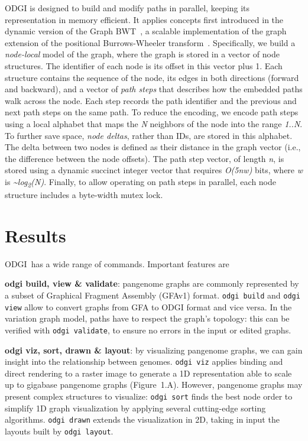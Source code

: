 \documentclass{bioinfo}
\newcommand{\odgi}{ODGI}
\newcommand{\cmd}[1]{{\texttt{#1}}}
\newcommand{\cmdbf}[1]{{\textbf{#1}}}
\newcommand{\topic}[1]{{\cmdbf{#1}}:}
\begin{document}
        ODGI is designed to build and modify paths in parallel, keeping its representation in memory efficient. It
        applies concepts first introduced in the dynamic version of the Graph BWT~\citep{31406990}, a scalable
        implementation of the graph extension of the positional Burrows-Wheeler transform~\citep{28702075}. Specifically,
        we build a \textit{node-local} model of the graph, where the graph is stored in a vector of node structures.
        The identifier of each node is its offset in this vector plus 1. Each structure contains the sequence of the
        node, its edges in both directions (forward and backward), and a vector of \textit{path steps} that describes
        how the embedded paths walk across the node. Each step records the path identifier and the previous and next
        path steps on the same path. To reduce the encoding, we encode path steps using a local alphabet that maps the
        \textit{N} neighbors of the node into the range \textit{1..N}. To further save space, \textit{node deltas},
        rather than IDs, are stored in this alphabet. The delta between two nodes is defined as their distance in the
        graph vector (i.e., the difference between the node offsets). The path step vector, of length \textit{n}, is
        stored using a dynamic succinct integer vector that requires \textit{O(5nw)} bits, where \textit{w} is
        \textit{\textasciitilde log\textsubscript{2}(N)}. Finally, to allow operating on path steps in parallel, each node structure includes a
        byte-width mutex lock.


    \section{Results}

    \odgi\ has a wide range of commands. Important features are

    \topic{odgi build, view \& validate} pangenome graphs are commonly
    represented by a subset of Graphical Fragment Assembly (GFAv1)
    format\citep{GFAv1}.  \cmd{odgi build} and \cmd{odgi view} allow
    to convert graphs from GFA to ODGI format and vice versa.  In the
    variation graph model, paths have to respect the graph's topology:
    this can be verified with \texttt{odgi validate}, to ensure no
    errors in the input or edited graphs.

    \topic{odgi viz, sort, drawn \& layout} by visualizing pangenome
    graphs, we can gain insight into the relationship between
    genomes. \cmd{odgi viz} applies binding and direct rendering to
    a raster image to generate a 1D representation able to scale up to
    gigabase pangenome graphs
    (Figure~1.A\vphantom{\ref{fig:01}}). However, pangenome graphs may
    present complex structures to visualize: \cmd{odgi sort} finds
    the best node order to simplify 1D graph visualization by applying
    several cutting-edge sorting algorithms. \cmd{odgi drawn}
    extends the visualization in 2D, taking in input the layouts built
    by \cmd{odgi layout}.
\end{document}
